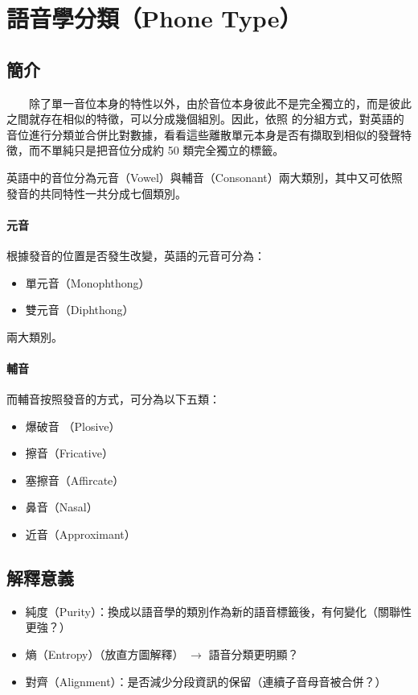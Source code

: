 \section{語音學分類（Phone Type）}

\subsection{簡介}

　　除了單一音位本身的特性以外，由於音位本身彼此不是完全獨立的，而是彼此之間就存在相似的特徵，可以分成幾個組別。因此，依照  的分組方式，對英語的音位進行分類並合併比對數據，看看這些離散單元本身是否有擷取到相似的發聲特徵，而不單純只是把音位分成約 50 類完全獨立的標籤。


        英語中的音位分為元音（Vowel）與輔音（Consonant）兩大類別，其中又可依照發音的共同特性一共分成七個類別。

\paragraph{元音}


根據發音的位置是否發生改變，英語的元音可分為：

\begin{itemize}
    \item 單元音（Monophthong）
    \item 雙元音（Diphthong）
\end{itemize}

兩大類別。

\paragraph{輔音}

而輔音按照發音的方式，可分為以下五類：

\begin{itemize}
    \item 爆破音 （Plosive）
    \item 擦音（Fricative）
    \item 塞擦音（Affircate）
    \item 鼻音（Nasal）
    \item 近音（Approximant）
\end{itemize}

\subsection{解釋意義}

\begin{itemize}
    \item 純度（Purity）：換成以語音學的類別作為新的語音標籤後，有何變化（關聯性更強？）
    \item 熵（Entropy）（放直方圖解釋） \(\rightarrow\) 語音分類更明顯？
    \item 對齊（Alignment）：是否減少分段資訊的保留（連續子音母音被合併？）
\end{itemize}
